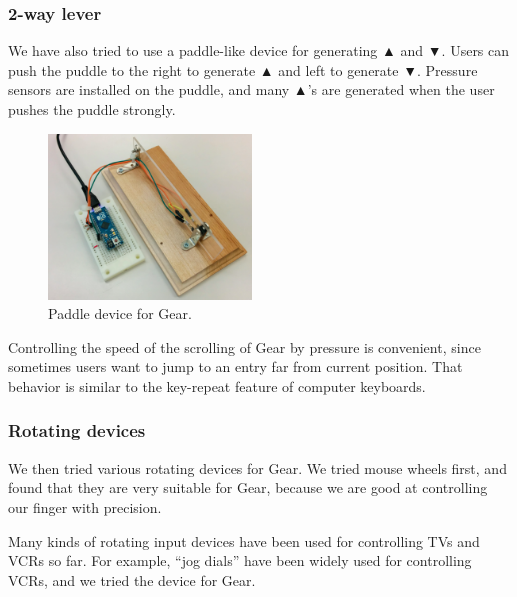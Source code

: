 \documentclass[conference]{IEEEtran}
\def\up{▲}
\def\down{▼}
\begin{document}
%


\subsubsection{2-way lever}

We have also tried to use a paddle-like device for generating {\up} and {\down}.
Users can push the puddle to the right to generate {\up} and
left to generate {\down}.
Pressure sensors are installed on the puddle, and
many {\up}'s are generated when the user pushes the puddle strongly.

\begin{figure}[H]
  \centerline{\includegraphics[width=54mm,bb=0 0 514 418]{figures/3c2de63899653056f3c6be835b9aaf43.png}}
\caption{Paddle device for Gear.}
\label{paddle}
\end{figure}

Controlling the speed of the scrolling of Gear by pressure is convenient,
since sometimes users want to jump to an entry far from current position.
That behavior is similar to the key-repeat feature of computer keyboards.


\subsubsection{Rotating devices}

We then tried various rotating devices for Gear.
%
We tried mouse wheels first, and found that they are very suitable for Gear,
because we are good at controlling our finger with precision.

Many kinds of rotating input devices have been used for controlling TVs and VCRs so far.
For example, ``jog dials'' have been widely used for controlling VCRs, and we tried the device for Gear.
\end{document}
